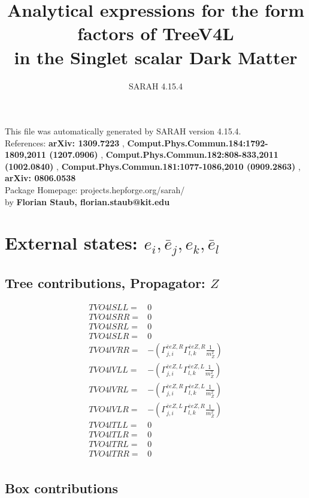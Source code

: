 \documentclass[A4,landscape]{article}
\begin{document}
\title{Analytical expressions for the form factors of TreeV4L\\ in the Singlet scalar Dark Matter } 
 \author{SARAH 4.15.4} 
 \maketitle 
 \vspace{10cm} 
This file was automatically generated by SARAH version 4.15.4.  \\ 
References: {\bf arXiv: 1309.7223 }, {\bf Comput.Phys.Commun.184:1792-1809,2011 (1207.0906) }, {\bf Comput.Phys.Commun.182:808-833,2011 (1002.0840) }, {\bf Comput.Phys.Commun.181:1077-1086,2010 (0909.2863) }, {\bf arXiv: 0806.0538 } \\ 
Package Homepage: projects.hepforge.org/sarah/ \\ 
by {\bf Florian Staub, florian.staub@kit.edu} 
 \pagebreak 
 \tableofcontents 
 \pagebreak 
\section{External states: ${e_{{i}}, \bar{e}_{{j}}, e_{{k}}, \bar{e}_{{l}}}$} 
\subsection{Tree contributions, Propagator: $Z$} 

\begin{align} 
  TVO4lSLL= & 0 \\ 
  TVO4lSRR= & 0 \\ 
  TVO4lSRL= & 0 \\ 
  TVO4lSLR= & 0 \\ 
  TVO4lVRR= & -(\Gamma^{\bar{e}e Z ,R}_{j, i} \Gamma^{\bar{e}e Z ,R}_{l, k} \frac{1}{m^2_{Z}}) \\ 
  TVO4lVLL= & -(\Gamma^{\bar{e}e Z ,L}_{j, i} \Gamma^{\bar{e}e Z ,L}_{l, k} \frac{1}{m^2_{Z}}) \\ 
  TVO4lVRL= & -(\Gamma^{\bar{e}e Z ,R}_{j, i} \Gamma^{\bar{e}e Z ,L}_{l, k} \frac{1}{m^2_{Z}}) \\ 
  TVO4lVLR= & -(\Gamma^{\bar{e}e Z ,L}_{j, i} \Gamma^{\bar{e}e Z ,R}_{l, k} \frac{1}{m^2_{Z}}) \\ 
  TVO4lTLL= & 0 \\ 
  TVO4lTLR= & 0 \\ 
  TVO4lTRL= & 0 \\ 
  TVO4lTRR= & 0 \\ 
\end{align} 
\subsection{Box contributions} 
\end{document}
